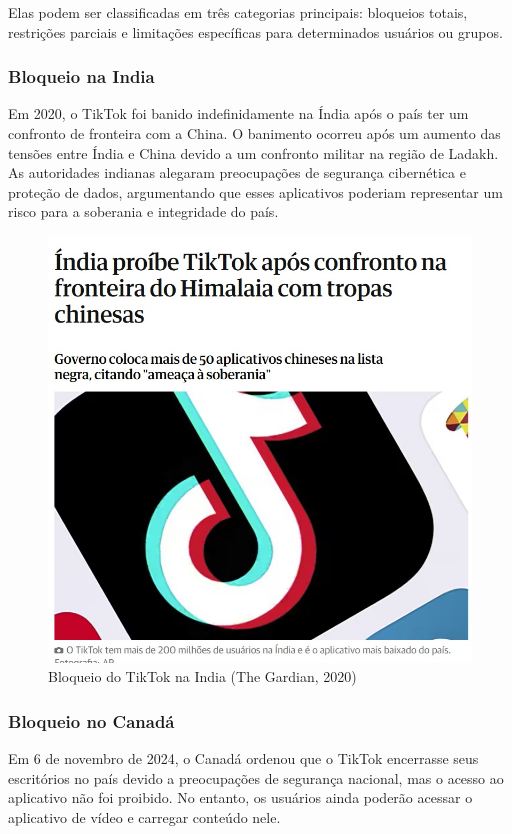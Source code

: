 Elas podem ser classificadas em três categorias principais: bloqueios totais, restrições parciais e limitações específicas para determinados usuários ou grupos.


\subsubsection{Bloqueio na India}
Em 2020, o TikTok foi banido indefinidamente na Índia após o país ter um confronto de fronteira com a China. O banimento ocorreu após um aumento das tensões entre Índia e China devido a um confronto militar na região de Ladakh. As autoridades indianas alegaram preocupações de segurança cibernética e proteção de dados, argumentando que esses aplicativos poderiam representar um risco para a soberania e integridade do país.
\vskip0.3cm

\begin{figure}[H]
    \centering
    \includegraphics[width=0.7\linewidth]{TIKTOK1.jpg}
    \caption{Bloqueio do TikTok na India (The Gardian, 2020)}
    \label{fig:enter-label} 
\end{figure}



\subsubsection{Bloqueio no Canadá}
Em 6 de novembro de 2024, o Canadá ordenou que o TikTok encerrasse seus escritórios no país devido a preocupações de segurança nacional, mas o acesso ao aplicativo não foi proibido. No entanto, os usuários ainda poderão acessar o aplicativo de vídeo e carregar conteúdo nele.










